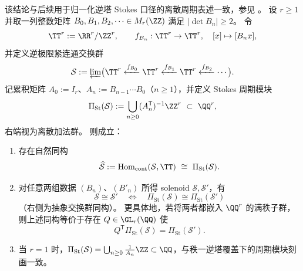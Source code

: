 \begin{theorem}\label{thm:app-high-rank-solenoid-pontryagin-stokes-period-module}
该结论与后续用于归一化逆塔 Stokes 口径的离散周期表述一致，参见 \cite{Internal2026HighRankStokesSolenoidPontryaginCompleteness}。
设 \(r\ge 1\) 并取一列整数矩阵 \(B_0,B_1,B_2,\dots\in M_r(\ZZ)\) 满足 \(|\det B_n|\ge 2\)。
令
\[
\TT^r:=\RR^r/\ZZ^r,\qquad
f_{B_n}:\TT^r\to\TT^r,\quad [x]\mapsto [B_nx],
\]
并定义逆极限紧连通交换群
\[
\mathcal S:=\varprojlim\bigl(\TT^r\xleftarrow{f_{B_0}}\TT^r\xleftarrow{f_{B_1}}\TT^r\xleftarrow{f_{B_2}}\cdots\bigr).
\]
记累积矩阵 \(A_0:=I_r\)、\(A_n:=B_{n-1}\cdots B_0\)（\(n\ge 1\)），并定义 Stokes 周期模块
\[
\Pi_{\mathrm{St}}(\mathcal S)
:=
\bigcup_{n\ge 0}(A_n^{\mathsf T})^{-1}\ZZ^r\ \subset\ \QQ^r,
\]
右端视为离散加法群。
则成立：
\begin{enumerate}
  \item 存在自然同构
  \[
  \widehat{\mathcal S}:=\mathrm{Hom}_{\mathrm{cont}}(\mathcal S,\TT)\ \cong\ \Pi_{\mathrm{St}}(\mathcal S).
  \]
  \item 对任意两组数据 \((B_n)\)、\((B'_n)\) 所得 solenoid \(\mathcal S,\mathcal S'\)，有
  \[
  \mathcal S\cong \mathcal S'
  \quad\Longleftrightarrow\quad
  \Pi_{\mathrm{St}}(\mathcal S)\cong \Pi_{\mathrm{St}}(\mathcal S')
  \]
  （右侧为抽象交换群同构）。
  更具体地，若将两者都嵌入 \(\QQ^r\) 的满秩子群，则上述同构等价于存在 \(Q\in\GL_r(\QQ)\) 使
  \[
  Q^{\mathsf T}\Pi_{\mathrm{St}}(\mathcal S)=\Pi_{\mathrm{St}}(\mathcal S').
  \]
  \item 当 \(r=1\) 时，\(\Pi_{\mathrm{St}}(\mathcal S)=\bigcup_{n\ge 0}\frac1{A_n}\ZZ\subset\QQ\)，与秩一逆塔覆盖下的周期模块刻画一致。
\end{enumerate}
\end{theorem}

